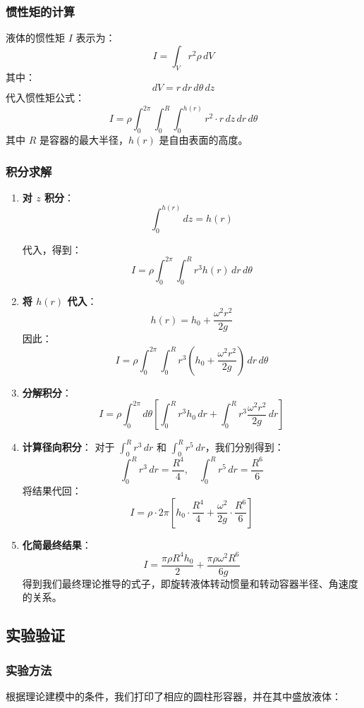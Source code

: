 \documentclass[12pt,hyperref,a4paper,UTF8]{ctexart}
\begin{document}
\subsubsection{惯性矩的计算}

液体的惯性矩 $I$ 表示为：  
$$
I = \int_V r^2 \rho \, dV
$$  
其中：  
$$
dV = r \, dr \, d\theta \, dz
$$  
代入惯性矩公式：  
$$
I = \rho \int_0^{2\pi} \int_0^{R} \int_0^{h(r)} r^2 \cdot r \, dz \, dr \, d\theta
$$  
其中 $R$ 是容器的最大半径，$h(r)$ 是自由表面的高度。

\subsubsection{积分求解}
\begin{enumerate}
\item \textbf{对 $z$ 积分}：  
$$
\int_0^{h(r)} dz = h(r)
$$  

代入，得到：  
$$
I = \rho \int_0^{2\pi} \int_0^{R} r^3 h(r) \, dr \, d\theta
$$  

\item \textbf{将 $h(r)$ 代入}：  
$$
h(r) = h_0 + \frac{\omega^2 r^2}{2g}
$$  
因此：  
$$
I = \rho \int_0^{2\pi} \int_0^{R} r^3 \left( h_0 + \frac{\omega^2 r^2}{2g} \right) \, dr \, d\theta
$$  

\item \textbf{分解积分}：  
$$
I = \rho \int_0^{2\pi} d\theta \left[ \int_0^{R} r^3 h_0 \, dr + \int_0^{R} r^3 \frac{\omega^2 r^2}{2g} \, dr \right]
$$  

\item \textbf{计算径向积分}：  
对于 $\int_0^R r^3 \, dr$ 和 $\int_0^R r^5 \, dr$，我们分别得到：  
$$
\int_0^R r^3 \, dr = \frac{R^4}{4}, \quad \int_0^R r^5 \, dr = \frac{R^6}{6}
$$  
将结果代回：  
$$
I = \rho \cdot 2\pi \left[ h_0 \cdot \frac{R^4}{4} + \frac{\omega^2}{2g} \cdot \frac{R^6}{6} \right]
$$  

\item \textbf{化简最终结果}：  
$$
I = \frac{\pi \rho R^4 h_0}{2} + \frac{\pi \rho \omega^2 R^6}{6g}
$$  
得到我们最终理论推导的式子，即旋转液体转动惯量和转动容器半径、角速度的关系。
\end{enumerate}
\subsection{实验验证}
\subsubsection{实验方法}
根据理论建模中的条件，我们打印了相应的圆柱形容器，并在其中盛放液体：
\end{document}
